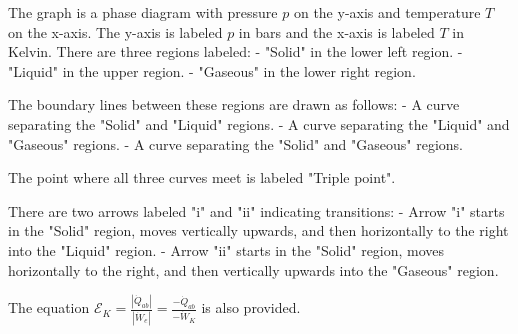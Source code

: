 The graph is a phase diagram with pressure \( p \) on the y-axis and temperature \( T \) on the x-axis. The y-axis is labeled \( p \) in bars and the x-axis is labeled \( T \) in Kelvin. There are three regions labeled:
- "Solid" in the lower left region.
- "Liquid" in the upper region.
- "Gaseous" in the lower right region.

The boundary lines between these regions are drawn as follows:
- A curve separating the "Solid" and "Liquid" regions.
- A curve separating the "Liquid" and "Gaseous" regions.
- A curve separating the "Solid" and "Gaseous" regions.

The point where all three curves meet is labeled "Triple point".

There are two arrows labeled "i" and "ii" indicating transitions:
- Arrow "i" starts in the "Solid" region, moves vertically upwards, and then horizontally to the right into the "Liquid" region.
- Arrow "ii" starts in the "Solid" region, moves horizontally to the right, and then vertically upwards into the "Gaseous" region.

The equation \( \mathcal{E}_K = \frac{|\dot{Q}_{ab}|}{|\dot{W}_e|} = \frac{-\dot{Q}_{ab}}{-\dot{W}_K} \) is also provided.